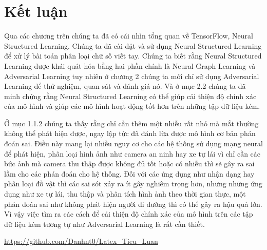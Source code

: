 
\chapter{Kết luận} %

\label{Chapter3} %

Qua các chương trên chúng ta đã có cái nhìn tổng quan về TensorFlow, Neural Structured Learning. Chúng ta đã cài đặt và sử dụng  Neural Structured Learning
để xử lý bài toán phân loại chữ số viết tay. Chúng ta biết rằng Neural Structured Learning được khái quát hóa bằng hai phần chính là Neural Graph Learning và
Adversarial Learning tuy nhiên ở chương 2 chúng ta mới chỉ sử dụng Adversarial Learning để thử nghiệm, quan sát và đánh giá nó. Và ở mục 2.2 chúng ta đã minh chứng 
rằng Neural Structured Learning có thể giúp cải thiện độ chính xác của mô hình và giúp các mô hình hoạt động tốt hơn trên những tập dữ liệu kém.

Ở mục 1.1.2 chúng ta thấy rằng chỉ cần thêm một nhiễu rất nhỏ mà mắt thường không thể phát hiện được, ngay lập tức đã đánh lừa được mô hình cơ bản phán đoán sai.
Điều này mang lại nhiều nguy cơ cho các hệ thống sử dụng mạng neural để phát hiện, phân loại hình ảnh như camera an ninh hay xe tự lái vì chỉ cần các bức ảnh mà camera
thu thập được không đủ tốt hoặc có nhiễu thì sẽ gây ra sai lầm cho các phán đoán cho hệ thống. Đối với các ứng dụng như nhận dạng hay phân loại đồ vật thì các sai sót xảy ra ít gây nghiêm trọng hơn, nhưng những ứng dụng như xe tự
lái, thu thập và phân tích hình ảnh theo thời gian thực, một phán đoán sai như không phát hiện người đi đường thì có thể gây ra hậu quả lớn. 
Vì vậy việc tìm ra các cách để cải thiện độ chính xác của mô hình trên các tập dữ liệu kém tương tự như Adversarial Learning là rất cần thiết.

\url{https://github.com/Danhnt0/Latex_Tieu_Luan}